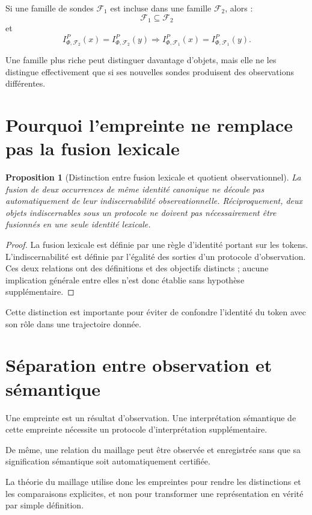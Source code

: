 \documentclass[11pt,a4paper]{report}
\theoremstyle{definition}
\theoremstyle{plain}
\newtheorem{proposition}[definition]{Proposition}
\theoremstyle{remark}
\newcommand{\F}{\mathcal{F}}
\begin{document}
Si une famille de sondes \(\F_1\) est incluse dans une famille
\(\F_2\), alors :
\[
\F_1\subseteq\F_2
\]
et
\[
I_{\Phi,\F_2}^{P}(x)=I_{\Phi,\F_2}^{P}(y)
\Rightarrow
I_{\Phi,\F_1}^{P}(x)=I_{\Phi,\F_1}^{P}(y).
\]

Une famille plus riche peut distinguer davantage d'objets, mais
elle ne les distingue effectivement que si ses nouvelles sondes
produisent des observations différentes.

\section{Pourquoi l'empreinte ne remplace pas la fusion lexicale}

\begin{proposition}[Distinction entre fusion lexicale et quotient
observationnel]
La fusion de deux occurrences de même identité canonique ne
découle pas automatiquement de leur indiscernabilité
observationnelle. Réciproquement, deux objets indiscernables
sous un protocole ne doivent pas nécessairement être fusionnés
en une seule identité lexicale.
\end{proposition}

\begin{proof}
La fusion lexicale est définie par une règle d'identité portant
sur les tokens. L'indiscernabilité est définie par l'égalité
des sorties d'un protocole d'observation. Ces deux relations
ont des définitions et des objectifs distincts ; aucune
implication générale entre elles n'est donc établie sans
hypothèse supplémentaire.
\end{proof}

Cette distinction est importante pour éviter de confondre
l'identité du token avec son rôle dans une trajectoire donnée.

\section{Séparation entre observation et sémantique}

Une empreinte est un résultat d'observation. Une interprétation
sémantique de cette empreinte nécessite un protocole d'interprétation
supplémentaire.

De même, une relation du maillage peut être observée et enregistrée
sans que sa signification sémantique soit automatiquement
certifiée.

La théorie du maillage utilise donc les empreintes pour rendre
les distinctions et les comparaisons explicites, et non pour
transformer une représentation en vérité par simple définition.
\end{document}
